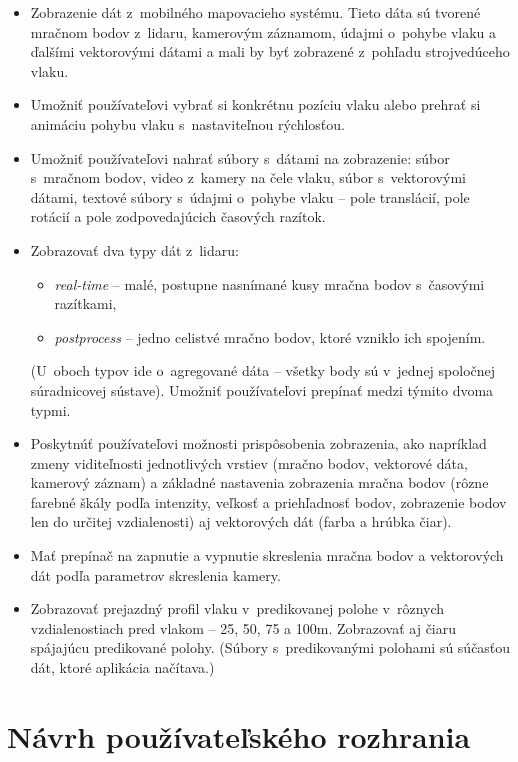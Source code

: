 \begin{itemize}
    \item Zobrazenie dát z~mobilného mapovacieho systému. Tieto dáta sú tvorené mračnom bodov z~lidaru, kamerovým záznamom, údajmi o~pohybe vlaku a ďalšími vektorovými dátami a mali by byť zobrazené z~pohľadu strojvedúceho vlaku.
    \item Umožniť používateľovi vybrať si konkrétnu pozíciu vlaku alebo prehrať si animáciu pohybu vlaku s~nastaviteľnou rýchlosťou.
    \item Umožniť používateľovi nahrať súbory s~dátami na zobrazenie: súbor s~mračnom bodov, video z~kamery na čele vlaku, súbor s~vektorovými dátami, textové súbory s~údajmi o~pohybe vlaku -- pole translácií, pole rotácií a pole zodpovedajúcich časových razítok.
    \item Zobrazovať dva typy dát z~lidaru:
    \begin{itemize}
        \item \emph{real-time} -- malé, postupne nasnímané kusy mračna bodov s~časovými razítkami,
        \item \emph{postprocess} -- jedno celistvé mračno bodov, ktoré vzniklo ich spojením.
    \end{itemize}
    (U~oboch typov ide o~agregované dáta -- všetky body sú v~jednej spoločnej súradnicovej sústave). Umožniť používateľovi prepínať medzi týmito dvoma typmi.
    \item Poskytnúť používateľovi možnosti prispôsobenia zobrazenia, ako napríklad zmeny viditeľnosti jednotlivých vrstiev (mračno bodov, vektorové dáta, kamerový záznam) a základné nastavenia zobrazenia mračna bodov (rôzne farebné škály podľa intenzity, veľkosť a priehľadnosť bodov, zobrazenie bodov len do určitej vzdialenosti) aj vektorových dát (farba a hrúbka čiar).
    \item Mať prepínač na zapnutie a vypnutie skreslenia mračna bodov a vektorových dát podľa parametrov skreslenia kamery.
    \item Zobrazovať prejazdný profil vlaku v~predikovanej polohe v~rôznych vzdialenostiach pred vlakom -- 25, 50, 75 a 100m. Zobrazovať aj čiaru spájajúcu predikované polohy. (Súbory s~predikovanými polohami sú súčasťou dát, ktoré aplikácia načítava.)

\end{itemize}

\section{Návrh používateľského rozhrania}


